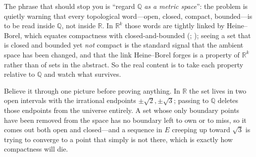 \documentclass[main.tex]{subfiles}
\begin{document}
\begin{Reflection}
The phrase that should stop you is ``regard $\mathbb Q$ \emph{as a metric space}'': the problem is
quietly warning that every topological word---open, closed, compact, bounded---is to be read inside
$\mathbb Q$, not inside $\mathbb R$. In $\mathbb R^k$ those words are tightly linked by Heine--Borel,
which equates compactness with closed-and-bounded (; ); seeing a set that is closed and bounded yet \emph{not} compact is the standard signal that the
ambient space has been changed, and that the link Heine--Borel forges is a property of $\mathbb R^k$
rather than of sets in the abstract. So the real content is to take each property relative to
$\mathbb Q$ and watch what survives.

Believe it through one picture before proving anything. In $\mathbb R$ the set lives in two open
intervals with the irrational endpoints $\pm\sqrt2,\pm\sqrt3$; passing to $\mathbb Q$ deletes those
endpoints from the universe entirely. A set whose only boundary points have been removed from the space
has no boundary left to own or to miss, so it comes out both open and closed---and a sequence in $E$
creeping up toward $\sqrt3$ is trying to converge to a point that simply is not there, which is exactly
how compactness will die.


\end{Reflection}
\end{document}
